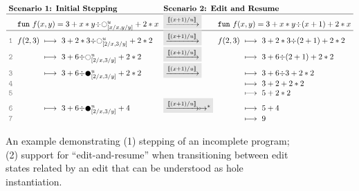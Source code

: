 \newcommand{\linenumber}[1]{{\color{gray} \texttt{#1}}}
\begin{figure}[ht]
\vspace{-5px}
\center
\small
\ensuremath{
\arraycolsep=3pt
\begin{array}{rrclcrcl}
\multicolumn{4}{l}{\textbf{Scenario 1: Initial Stepping}}
&
\multicolumn{4}{l}{\textbf{Scenario 2: Edit and Resume}}
\\
\hline
&
\multicolumn{3}{l}{\texttt{fun}~f(x,y) = 3 + x * y {\div} \hehole{\metavar}_{[x/x,y/y]} + 2 * x}
&
\multicolumn{1}{l}{
\colorbox{dVeryFaint}{$\xrightarrow{\llbracket (x+1) / u \rrbracket}$}
}
&
\multicolumn{3}{l}{\texttt{fun}~f(x,y) = 3 + x * y {\div} (x+1) + 2 * x}
\\
\hline
\linenumber{1} & 
f(2,3) &\longmapsto & 3 + 2 * 3 {\div} \hehole{\metavar}_{[2/x, 3/y]}  + 2 * 2
&
\multicolumn{1}{l}{
\colorbox{dVeryFaint}{$\xrightarrow{\llbracket (x+1) / u \rrbracket}$}
} 
&
f(2,3) &{\longmapsto} & {3 + 2 * 3 {\div} (2+1) + 2 * 2}
\\
\linenumber{2} & 
&\longmapsto& 3 + 6 {\div} \hehole{\metavar}_{[2/x, 3/y]} + 2 * 2
&
\multicolumn{1}{l}{
\colorbox{dVeryFaint}{$\xrightarrow{\llbracket (x+1) / u \rrbracket}$}
}
&& {\longmapsto} & {3 + 6 {\div} (2 + 1) + 2 * 2}
\\
\linenumber{3} &
&\longmapsto & 3 + 6 {\div} \heholechk{\metavar}_{[2/x, 3/y]} + 2 * 2
&\multicolumn{1}{l}{
\colorbox{dVeryFaint}{$\xrightarrow{\llbracket (x+1) / u \rrbracket}$}
}
&& \longmapsto& {3 + 6 {\div} 3 + 2 * 2}
\\
\linenumber{4} &
&&
&&& \longmapsto& 3 + 2 + 2 * 2
\\
\linenumber{5} &
&&
&&& \longmapsto & 5 + 2 * 2
\\
\linenumber{6} &
& \longmapsto &3 + 6 {\div} \heholechk{\metavar}_{[2/x, 3/y]} + 4 
&
\multicolumn{1}{l}{
\colorbox{dVeryFaint}{$\xrightarrow{\llbracket (x+1) / u \rrbracket}\mapsto^{*}$}
}
&& \longmapsto & 5 + 4
\\
\linenumber{7} &
&& 
&&& \longmapsto & 9
\end{array}
}
\vspace{-5px}
\caption{An example demonstrating (1) stepping of an incomplete program; (2) support for ``edit-and-resume'' when transitioning between edit states related by an edit that can be understood as hole instantiation.}
\vspace{-5px}
\label{fig:dynamics}
\end{figure}

